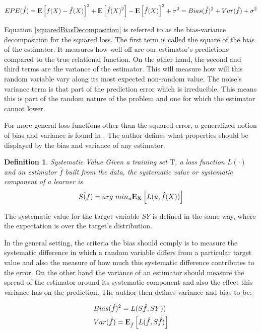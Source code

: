 \documentclass{article}%
\newcommand{\Expect}{{\rm I\kern-.3em E}}
\newtheorem{definition}{Definition}[subsection]
\theoremstyle{definition}
\begin{document}
 \begin{equation}\label{squaredBiasDecomposition}
 EPE( \hat{f} ) = \Expect \left[   f(X)  - \hat{f}(X) \right]^2 +  \Expect \left[ \hat{f}(X)^2  \right] - \Expect \left[ \hat{f}(X)  \right]^2  + \sigma^2
 = Bias(\hat{f})^2 + Var(\hat{f}) + \sigma^2
 \end{equation}
 
 Equation \ref{squaredBiasDecomposition} is referred to as the bias-variance decomposition for the squared loss. The first term is called the square of the bias of the estimator. It measures how well off are our estimator's predictions compared to the true relational function. On the other hand, the second and third terms are the variance of the estimator. This will measure how will this random variable vary along its most expected non-random value. The noise's variance term is that part of the prediction error which is irreducible. This means this is part of the random nature of the problem and one for which the estimator cannot lower.
 
 For more general loss functions other than the squared error, a generalized notion of bias and variance is found in \cite{james-biasVarianceGeneral}. The author defines what properties should be displayed by the bias and variance of any estimator. 
 \begin{definition}{Systematic Value}
 	Given a training set $\mathrm{T}$, a loss function $L(\cdot)$ and an estimator $\hat{f}$ built from the data, the systematic value or systematic component of a learner is 
 	$$ S\hat(f)  =  arg \ min_u \Expect_{\textbf{X}} \left[ L(u,\hat{f}(X)) \right]$$
 \end{definition}
 
 The systematic value for the target variable $SY$ is defined in the same way, where the expectation is over the target's distribution. 
 
 In the general setting, the criteria the bias should comply is to measure the systematic difference in which a random variable differs from a particular target value and also the measure of how much this systematic difference contributes to the error. On the other hand the variance of an estimator should measure the spread of the estimator around its systematic component and also the effect this variance has on the prediction. The author then defines variance and bias to be:
 
 \begin{equation}
 \begin{split}
 & Bias(\hat{f})^2 = L(S\hat{f},SY)) \\
 & Var(\hat{f}) = \Expect_{\hat{f}} \left[  L(\hat{f}  , S\hat{f}) \right]
 \end{split}
 \end{equation}
 
\end{document}
